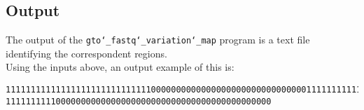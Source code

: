 \subsection*{Output}
The output of the \texttt{gto\char`_fastq\char`_variation\char`_map} program is a text file identifying the correspondent regions.\\
Using the inputs above, an output example of this is:
\begin{lstlisting}
1111111111111111111111111111100000000000000000000000000000001111111111111111111
11111111110000000000000000000000000000000000000000000
\end{lstlisting}
